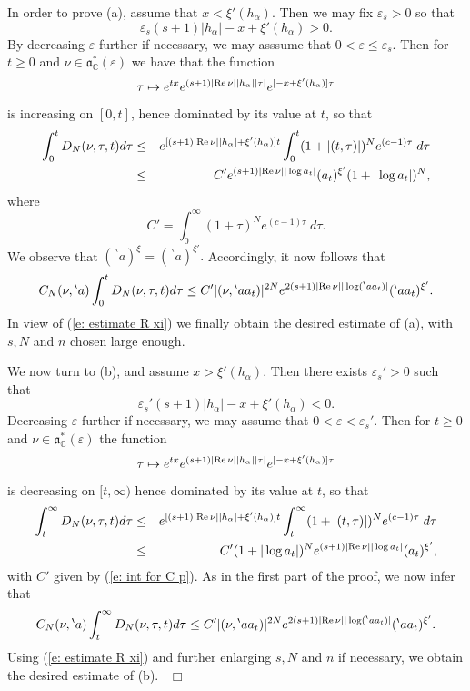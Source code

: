\documentclass[12pt,a4paper]{article}
\def\qed{~\hfill\hbox{$\Box$}\medbreak}
\def\msy#1{{\mathbb #1}}
\def\C{{\msy C}}
\def\ga{\alpha}
\def\ge{\varepsilon}
\def\got#1{\mathfrak #1}
\def\fa{{\got a}}
\def\Re{{\rm Re}\,}
\numberwithin{Thm}{section}
\numberwithin{equation}{section}
\def\fadc{\fa_\C^*}
\numberwithin{equation}{section}
\def\bp{\!{\,}^\backprime}
\def\snorm{n}
\def\xx{x}
\def\xxi{\xi}
\begin{document}
In order to prove (a), assume that $\xx < \xxi'(h_\ga).$ 
Then we may fix $\ge_s >0$ so that 
$$ 
\ge_s (s+1) |h_\ga|  - \xx +  \xxi'(h_\ga)  > 0. 
$$ 
By decreasing $\ge$ further if necessary, we may asssume that $0 < \ge \leq \ge_s.$ 
Then for $t \geq 0$ and $\nu \in \fadc(\ge)$ we have that the function 
$$ 
\tau \mapsto e^{t\xx} e^{ (s+1) |\Re \nu| |h_\ga||\tau|}  e^{[ -\xx   + \xxi'(h_\ga)]\tau}
$$ 
is increasing on $[0,t]$, hence dominated by its value at $t$, so 
that  
\begin{eqnarray*} 
\int_0^t D_N(\nu, \tau,t) d\tau 
& \leq & e^{ [ (s+1)|\Re \nu| |h_\ga|  + \xxi'(h_\ga) ] t   } 
\int_0^t (1+ |(t,\tau)|)^N e^{(c-1)\tau} \; d \tau \\
& \leq & C'    e^{(s+1) |\Re \nu||\log a_t|}   (a_t)^{\xxi'} (1+ |\log a_t|)^N , 
\end{eqnarray*} 
where 
\begin{equation}
\label{e: int for C p}
C' = \int_0^\infty (1 + \tau)^N e^{(c-1)\tau} \; d\tau.
\end{equation}
We observe that 
$(\bp a)^\xxi = (\bp a)^{\xxi'}.$ Accordingly, it now follows
that 
\begin{equation*}
C_N(\nu, \bp a) \int_0^t D_N(\nu, \tau,t) d\tau 
  \leq   
C' |(\nu, \bp aa_t)|^{2N} 
e^{2(s+1)|\Re \nu||\log (\bp a a_t) | }  (\bp aa_t)^{\xxi'}.
\end{equation*}
In view of (\ref{e: estimate R xi}) we finally obtain the desired estimate
of (a), with $s, N$ and $\snorm$ chosen large enough.

We now turn to (b), and assume $\xx > \xxi'(h_\ga).$ Then there exists 
$\ge_s' > 0$ such that 
$$ 
\ge_s' (s+1) |h_\ga|  -\xx + \xxi'(h_\ga)  < 0.
$$ 
Decreasing $\ge$ further if necessary, we may assume that 
$0<\ge < \ge_s'.$ Then for $t \geq 0$ and $\nu \in \fadc(\ge)$ 
the function
$$ 
\tau \mapsto e^{t\xx} e^{ (s+1) |\Re \nu| |h_\ga||\tau|}  e^{[ -\xx   + \xxi'(h_\ga)]\tau}
$$ 
is decreasing on $[t, \infty)$ hence dominated by its value  at $t$, so that 
\begin{eqnarray*} 
\int_t^\infty D_N(\nu, \tau,t) d\tau 
& \leq & e^{ [ (s+1)|\Re \nu| |h_\ga|  + \xxi'(h_\ga) ] t   } 
\int_t^\infty (1+ |(t,\tau)|)^N e^{(c-1)\tau} \; d \tau \\
& \leq & C'   (1+ |\log a_t|)^N  e^{(s+1) |\Re \nu||\log a_t|}   (a_t)^{\xxi'}, 
\end{eqnarray*} 
with $C'$ given by (\ref{e: int for C p}).
As in the first part of the proof, we now infer that 
$$ 
C_N(\nu, \bp a) \int_t^\infty D_N(\nu, \tau,t) d\tau \leq 
C' |(\nu, \bp aa_t)|^{2N} 
e^{2(s+1)|\Re \nu||\log (\bp a a_t) | }  (\bp aa_t)^{\xxi'}.
$$
Using (\ref{e: estimate R xi}) and further enlarging $s, N$ and $\snorm$ if necessary, we 
obtain the desired estimate of (b).
\qed
\end{document}
